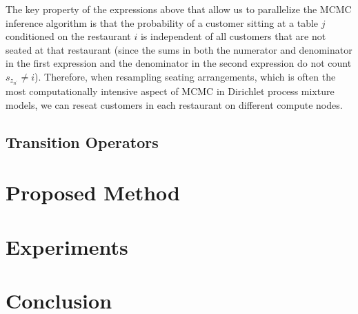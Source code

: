 \documentclass{article}
\begin{document}
The key property of the expressions above that allow us to parallelize
the MCMC inference algorithm is that the probability of a customer
sitting at a table $j$ conditioned on the restaurant $i$ is
independent of all customers that are not seated at that restaurant
(since the sums in both the numerator and denominator in the first
expression and the denominator in the second expression do not count
$s_{z_{n^\prime}} \neq i$). Therefore, when resampling seating
arrangements, which is often the most computationally intensive aspect
of MCMC in Dirichlet process mixture models, we can reseat customers
in each restaurant on different compute nodes.

\subsection{Transition Operators}
\label{sec:parallel-transition-operators}



\section{Proposed Method}
\label{sec:proposed-method}

\section{Experiments}
\label{sec:experiments}

\section{Conclusion}
\label{sec:conclusion}



\end{document}
